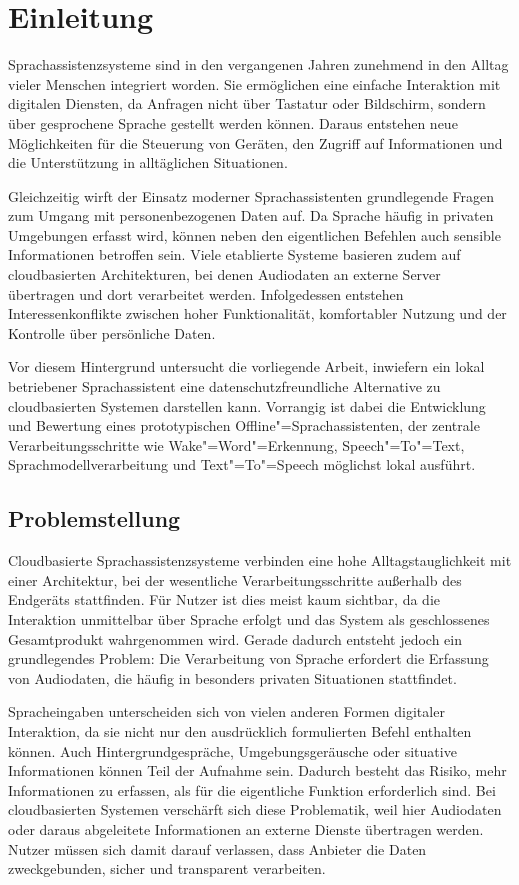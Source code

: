 \chapter{Einleitung}
\label{chap:Einleitung}
Sprachassistenzsysteme sind in den vergangenen Jahren zunehmend in den Alltag vieler Menschen integriert worden. Sie ermöglichen eine einfache Interaktion mit digitalen Diensten, da Anfragen nicht über Tastatur oder Bildschirm, sondern über gesprochene Sprache gestellt werden können. Daraus entstehen neue Möglichkeiten für die Steuerung von Geräten, den Zugriff auf Informationen und die Unterstützung in alltäglichen Situationen.

Gleichzeitig wirft der Einsatz moderner Sprachassistenten grundlegende Fragen zum Umgang mit personenbezogenen Daten auf. Da Sprache häufig in privaten Umgebungen erfasst wird, können neben den eigentlichen Befehlen auch sensible Informationen betroffen sein. Viele etablierte Systeme basieren zudem auf cloudbasierten Architekturen, bei denen Audiodaten an externe Server übertragen und dort verarbeitet werden. Infolgedessen entstehen Interessenkonflikte zwischen hoher Funktionalität, komfortabler Nutzung und der Kontrolle über persönliche Daten.

Vor diesem Hintergrund untersucht die vorliegende Arbeit, inwiefern ein lokal betriebener Sprachassistent eine datenschutzfreundliche Alternative zu cloudbasierten Systemen darstellen kann. Vorrangig ist dabei die Entwicklung und Bewertung eines prototypischen Offline"=Sprachassistenten, der zentrale Verarbeitungsschritte wie Wake"=Word"=Erkennung, Speech"=To"=Text, Sprachmodellverarbeitung und Text"=To"=Speech möglichst lokal ausführt.


\section{Problemstellung}
\label{sec:Problemstellung}
Cloudbasierte Sprachassistenzsysteme verbinden eine hohe Alltagstauglichkeit mit einer Architektur, bei der wesentliche Verarbeitungsschritte außerhalb des Endgeräts stattfinden. Für Nutzer ist dies meist kaum sichtbar, da die Interaktion unmittelbar über Sprache erfolgt und das System als geschlossenes Gesamtprodukt wahrgenommen wird. Gerade dadurch entsteht jedoch ein grundlegendes Problem: Die Verarbeitung von Sprache erfordert die Erfassung von Audiodaten, die häufig in besonders privaten Situationen stattfindet.

Spracheingaben unterscheiden sich von vielen anderen Formen digitaler Interaktion, da sie nicht nur den ausdrücklich formulierten Befehl enthalten können. Auch Hintergrundgespräche, Umgebungsgeräusche oder situative Informationen können Teil der Aufnahme sein. Dadurch besteht das Risiko, mehr Informationen zu erfassen, als für die eigentliche Funktion erforderlich sind. Bei cloudbasierten Systemen verschärft sich diese Problematik, weil hier Audiodaten oder daraus abgeleitete Informationen an externe Dienste übertragen werden. Nutzer müssen sich damit darauf verlassen, dass Anbieter die Daten zweckgebunden, sicher und transparent verarbeiten.

